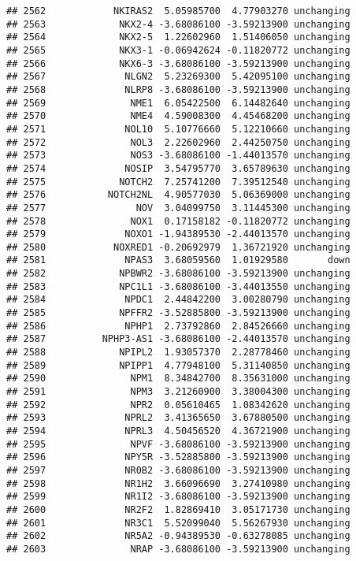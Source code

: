 \documentclass[]{article}
\begin{document}
\begin{verbatim}
## 2562            NKIRAS2  5.05985700  4.77903270 unchanging
## 2563             NKX2-4 -3.68086100 -3.59213900 unchanging
## 2564             NKX2-5  1.22602960  1.51406050 unchanging
## 2565             NKX3-1 -0.06942624 -0.11820772 unchanging
## 2566             NKX6-3 -3.68086100 -3.59213900 unchanging
## 2567              NLGN2  5.23269300  5.42095100 unchanging
## 2568              NLRP8 -3.68086100 -3.59213900 unchanging
## 2569               NME1  6.05422500  6.14482640 unchanging
## 2570               NME4  4.59008300  4.45468200 unchanging
## 2571              NOL10  5.10776660  5.12210660 unchanging
## 2572               NOL3  2.22602960  2.44250750 unchanging
## 2573               NOS3 -3.68086100 -1.44013570 unchanging
## 2574              NOSIP  3.54795770  3.65789630 unchanging
## 2575             NOTCH2  7.25741200  7.39512540 unchanging
## 2576           NOTCH2NL  4.90577030  5.06369000 unchanging
## 2577                NOV  3.04099750  3.11445300 unchanging
## 2578               NOX1  0.17158182 -0.11820772 unchanging
## 2579              NOXO1 -1.94389530 -2.44013570 unchanging
## 2580            NOXRED1 -0.20692979  1.36721920 unchanging
## 2581              NPAS3  3.68059560  1.01929580       down
## 2582             NPBWR2 -3.68086100 -3.59213900 unchanging
## 2583             NPC1L1 -3.68086100 -3.44013550 unchanging
## 2584              NPDC1  2.44842200  3.00280790 unchanging
## 2585             NPFFR2 -3.52885800 -3.59213900 unchanging
## 2586              NPHP1  2.73792860  2.84526660 unchanging
## 2587          NPHP3-AS1 -3.68086100 -2.44013570 unchanging
## 2588             NPIPL2  1.93057370  2.28778460 unchanging
## 2589             NPIPP1  4.77948100  5.31140850 unchanging
## 2590               NPM1  8.34842700  8.35631000 unchanging
## 2591               NPM3  3.21260900  3.38004300 unchanging
## 2592               NPR2  0.05610465  1.08342620 unchanging
## 2593              NPRL2  3.41365650  3.67880500 unchanging
## 2594              NPRL3  4.50456520  4.36721900 unchanging
## 2595               NPVF -3.68086100 -3.59213900 unchanging
## 2596              NPY5R -3.52885800 -3.59213900 unchanging
## 2597              NR0B2 -3.68086100 -3.59213900 unchanging
## 2598              NR1H2  3.66096690  3.27410980 unchanging
## 2599              NR1I2 -3.68086100 -3.59213900 unchanging
## 2600              NR2F2  1.82869410  3.05171730 unchanging
## 2601              NR3C1  5.52099040  5.56267930 unchanging
## 2602              NR5A2 -0.94389530 -0.63278085 unchanging
## 2603               NRAP -3.68086100 -3.59213900 unchanging

\end{verbatim}
\end{document}
